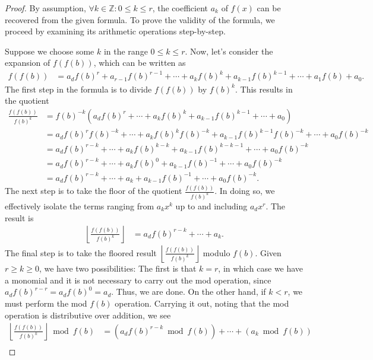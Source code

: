 \documentclass{article}
\theoremstyle{plain}
\theoremstyle{definition}
\newcommand{\floor}[1]{\left\lfloor #1 \right\rfloor}
\begin{document}
\begin{proof}
By assumption, $\forall k \in \mathbb{Z} : 0 \leq k \leq r$, the coefficient $a_k$ of $f(x)$ can be recovered from the given formula. To prove the validity of the formula, we proceed by examining its arithmetic operations step-by-step.

Suppose we choose some $k$ in the range $0 \leq k \leq r$. Now, let's consider the expansion of $f(f(b))$, which can be written as
\begin{align*}
f(f(b)) &= a_d f(b)^r + a_{r-1} f(b)^{r-1} + \cdots + a_{k} f(b)^{k} + a_{k-1} f(b)^{k-1} + \cdots + a_1 f(b) + a_0 .
\end{align*}
The first step in the formula is to divide $f(f(b))$ by $f(b)^{k}$. This results in the quotient
\begin{align*}
\frac{f(f(b))}{f(b)^k} &= f(b)^{-k} (a_d f(b)^r  + \cdots + a_{k} f(b)^{k} + a_{k-1} f(b)^{k-1} + \cdots + a_0) \\
&= a_d f(b)^r f(b)^{-k} + \cdots + a_{k} f(b)^{k} f(b)^{-k} + a_{k-1} f(b)^{k-1} f(b)^{-k} + \cdots + a_0 f(b)^{-k} \\
&= a_d f(b)^{r-k} + \cdots + a_{k} f(b)^{k-k} + a_{k-1} f(b)^{k-k-1} + \cdots + a_0 f(b)^{-k}  \\
&= a_d f(b)^{r-k} + \cdots + a_{k} f(b)^{0} + a_{k-1} f(b)^{-1} + \cdots + a_0 f(b)^{-k}  \\
&= a_d f(b)^{r-k} + \cdots + a_{k} + a_{k-1} f(b)^{-1} + \cdots + a_0 f(b)^{-k} .
\end{align*}
The next step is to take the floor of the quotient $\frac{f(f(b))}{f(b)^k}$. In doing so, we effectively isolate the terms ranging from $a_k x^k$ up to and including $a_d x^r$. The result is
\begin{align*}
\floor{\frac{f(f(b))}{f(b)^k}} &= a_d f(b)^{r-k} + \cdots + a_{k} .
\end{align*}
The final step is to take the floored result $\floor{\frac{f(f(b))}{f(b)^k}}$ modulo $f(b)$. Given $r \geq k \geq 0$, we have two possibilities: The first is that $k = r$, in which case we have a monomial and it is not necessary to carry out the mod operation, since $a_d f(b)^{r-r} = a_d f(b)^{0} = a_d$. Thus, we are done. On the other hand, if $k < r$, we must perform the mod $f(b)$ operation. Carrying it out, noting that the mod operation is distributive over addition, we see
\begin{align*}
\floor{\frac{f(f(b))}{f(b)^{k}}} \bmod{f(b)} &= (a_d f(b)^{r-k} \bmod{f(b)}) + \cdots + (a_{k} \bmod{f(b)}) \\

\end{align*}
\end{proof}
\end{document}
